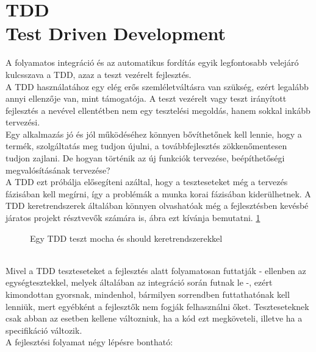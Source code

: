 \section{TDD\\\small{Test Driven Development}}
A folyamatos integráció és az automatikus fordítás egyik legfontosabb velejáró kulcsszava a TDD, azaz a teszt vezérelt fejlesztés.
\\
A TDD használatához egy elég erős szemléletváltásra van szükség, ezért legalább annyi ellenzője van, mint támogatója. A teszt vezérelt vagy teszt irányított fejlesztés a nevével ellentétben nem egy tesztelési megoldás, hanem sokkal inkább tervezési. \cite{tddjs_definition}
\\
Egy alkalmazás jó és jól működéséhez könnyen bővíthetőnek kell lennie, hogy a termék, szolgáltatás meg tudjon újulni, a továbbfejlesztés zökkenőmentesen tudjon zajlani. De hogyan történik az új funkciók tervezése, beépíthetőségi megvalósításának tervezése?
\\
A TDD ezt próbálja elősegíteni azáltal, hogy a teszteseteket még a tervezés fázisában kell megírni, így a problémák a munka korai fázisában kiderülhetnek. A TDD keretrendszerek általában könnyen olvashatóak még a fejlesztésben kevésbé járatos projekt résztvevők számára is,  ábra ezt kívánja bemutatni.
\ref{fig:mocha_should_tdd_test}
\begin{figure}[ht]
	\centering
		
		\caption{Egy TDD teszt mocha és should keretrendszerekkel}
		\label{fig:mocha_should_tdd_test}
\end{figure}
\\
Mivel a TDD teszteseteket a fejlesztés alatt folyamatosan futtatják - ellenben az egységtesztekkel, melyek általában az integráció során futnak le -, ezért kimondottan gyorsnak, mindenhol, bármilyen sorrendben futtathatónak kell lenniük, mert egyébként a fejlesztők nem fogják felhasználni őket. Teszteseteknek csak abban az esetben kellene változniuk, ha a kód ezt megköveteli, illetve ha a specifikáció változik.
\\
A fejlesztési folyamat négy lépésre bontható:
\hfill\\

